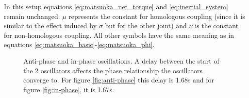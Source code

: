 \documentclass[12pt,twoside]{article}
\theoremstyle{plain}
\theoremstyle{definition}
\theoremstyle{remark}
\begin{document}
\begin{enumerate}
In this setup equations \ref{eq:matsuoka_net_torque} and  \ref{eq:inertial_system} remain unchanged. $\mu$ represents the constant for homologous coupling (since it is similar to the effect induced by $\sigma$ but for the other joint) and $\nu$ is the constant for non-homologous coupling. All other symbols have the same meaning as in equations  \ref{eq:matsuoka_basic}-\ref{eq:matsuoka_phi}.
\end{enumerate}

\begin{figure}[htbp]
\centering     %
{}
\caption{Anti-phase and in-phase oscillations. A delay between the start of the 2 oscillators affects the phase relationship the oscillators converge to. For figure \ref{fig:anti-phase} this delay is 1.68s and for figure \ref{fig:in-phase}, it is 1.67s.}
\label{fig:in-anti-phase}
\end{figure}
\end{document}
